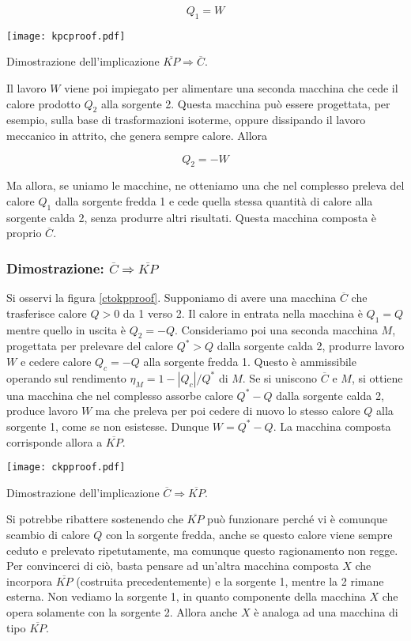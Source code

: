 \[ Q_1 = W \]

\begin{marginfigure}
    \centering
    \texttt{[image: kpcproof.pdf]}
    \caption{Dimostrazione dell'implicazione $\overline{KP} \Rightarrow \overline{C}$.}
    \label{kptocproof}
\end{marginfigure}

\noindent Il lavoro $W$ viene poi impiegato per alimentare una
seconda macchina che cede il calore prodotto $Q_2$ alla sorgente
2. Questa macchina può essere progettata, per esempio, sulla base
di trasformazioni isoterme, oppure dissipando il lavoro meccanico
in attrito, che genera sempre calore. Allora

\[ Q_2 = -W \]

\noindent Ma allora,
se uniamo le macchine, ne otteniamo una che nel complesso preleva
del calore $Q_1$ dalla sorgente fredda 1 e cede quella stessa
quantità di calore alla sorgente calda 2, senza produrre altri
risultati. Questa macchina composta è proprio $\overline{C}$.

\subsubsection*{Dimostrazione: $\overline{C} \Rightarrow \overline{KP}$}
Si osservi la figura \ref{ctokpproof}.
Supponiamo di avere una macchina $\overline{C}$ che trasferisce
calore $Q > 0$ da 1 verso 2. Il calore in entrata nella macchina è
$Q_1 = Q$ mentre quello in uscita è $Q_2 = -Q$.
Consideriamo poi una seconda macchina $M$, progettata per prelevare
del calore $Q^* > Q$ dalla sorgente calda 2, produrre lavoro $W$
e cedere calore $Q_c = -Q$ alla sorgente fredda 1. Questo è ammissibile
operando sul rendimento $\eta_M = 1 - |Q_c|/Q^*$ di $M$.
Se si uniscono $\overline{C}$ e $M$, si ottiene una macchina che nel
complesso assorbe calore $Q^* - Q$ dalla sorgente calda 2, produce
lavoro $W$ ma che preleva per poi cedere di nuovo lo stesso calore
$Q$ alla sorgente 1, come se non esistesse. Dunque $W = Q^* - Q$.
La macchina composta corrisponde allora a $\overline{KP}$.

\begin{marginfigure}
    \centering
    \texttt{[image: ckpproof.pdf]}
    \caption{Dimostrazione dell'implicazione $\overline{C} \Rightarrow \overline{KP}$.}
    \label{ctokpproof}
\end{marginfigure}

Si potrebbe ribattere sostenendo che $\overline{KP}$ può funzionare
perché vi è comunque scambio di calore $Q$ con la sorgente fredda,
anche se questo calore viene sempre ceduto e prelevato ripetutamente,
ma comunque questo ragionamento non regge. Per convincerci di ciò,
basta pensare ad un'altra macchina composta $X$ che incorpora
$\overline{KP}$ (costruita precedentemente) e la sorgente 1, mentre la 2
rimane esterna. Non vediamo la sorgente 1, in quanto componente
della macchina $X$ che opera solamente con la sorgente 2. Allora anche $X$
è analoga ad una macchina di tipo $\overline{KP}$.


